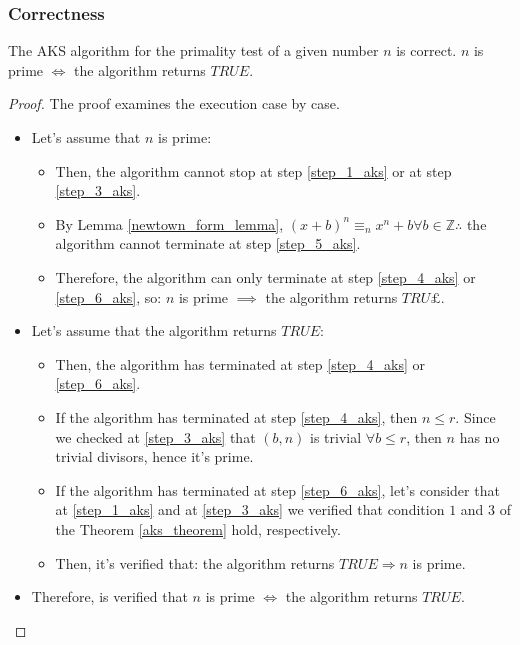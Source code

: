 \subsubsection{Correctness}
\begin{theorem}
    The AKS algorithm for the primality test of a given number $n$ is correct.\newline
    $n$ is prime $\iff$ the algorithm returns $TRUE$.
\end{theorem}
\begin{proof}
    The proof examines the execution case by case.\newline
    \begin{itemize}
        \item Let's assume that $n$ is prime:
        \begin{itemize}
            \item Then, the algorithm cannot stop at step \ref{step_1_aks} or at step \ref{step_3_aks}.
            \item By Lemma \ref{newtown_form_lemma}, $ (x + b)^{n} \equiv_{n} x^{n} + b \forall b \in \mathbb{Z} \therefore$ the algorithm cannot terminate at step \ref{step_5_aks}.
            \item Therefore, the algorithm can only terminate at step \ref{step_4_aks} or \ref{step_6_aks}, so: $n$ is prime $\implies$ the algorithm returns $TRU£$.
        \end{itemize}
        \item Let's assume that the algorithm returns $TRUE$:
        \begin{itemize}
            \item Then, the algorithm has terminated at step \ref{step_4_aks} or \ref{step_6_aks}.
            \item If the algorithm has terminated at step \ref{step_4_aks}, then $n \leq r$. Since we checked at \ref{step_3_aks} that $(b,n)$ is trivial $\forall b \leq r$, then $n$ has no trivial divisors, hence it's prime.
            \item If the algorithm has terminated at step \ref{step_6_aks}, let's consider that at \ref{step_1_aks} and at \ref{step_3_aks} we verified that condition $1$ and $3$ of the Theorem \ref{aks_theorem} hold, respectively.
            \item Then, it's verified that: the algorithm returns $TRUE \Rightarrow n$ is prime.
        \end{itemize}
        \item Therefore, is verified that $n$ is prime $\iff$ the algorithm returns $TRUE$.
    \end{itemize}
\end{proof}

